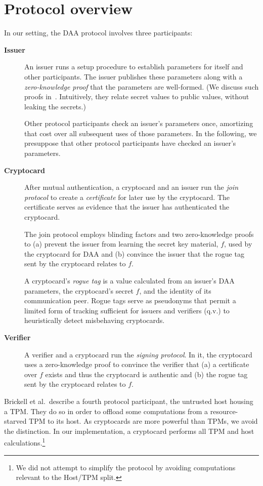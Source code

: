 \section{Protocol overview}

In our setting, the DAA protocol involves three participants:
\begin{description}

\item[\textbf{Issuer}]
An issuer runs a setup procedure to establish
parameters for itself and other participants.
The issuer publishes these parameters along with a
\emph{zero-knowledge proof} that the parameters
are well-formed. (We discuss such proofs in~. Intuitively,
they relate secret values to public values, without leaking the secrets.)

Other protocol participants check an issuer's parameters
once, amortizing that cost over all subsequent uses of those parameters.
In the following, we presuppose that other protocol participants have
checked an issuer's parameters.

\item[\textbf{Cryptocard}]
After mutual authentication, a cryptocard and an issuer run the \emph{join protocol}
to create a \emph{certificate} for later use by the cryptocard.
The certificate serves as evidence that the issuer has authenticated the cryptocard.

The join protocol employs blinding factors and two zero-knowledge proofs
to (a) prevent the issuer from learning the secret key material, $f$, used by the
cryptocard for DAA and (b) convince the issuer that the rogue tag
sent by the cryptocard relates to $f$.

A cryptocard's \emph{rogue tag} is a value calculated from an issuer's DAA parameters,
the cryptocard's secret $f$, and the identity of its communication peer.
Rogue tags serve as pseudonyms that permit a limited
form of tracking sufficient for issuers and verifiers (q.v.) to heuristically
detect misbehaving cryptocards.

\item[\textbf{Verifier}]
A verifier and a cryptocard run the \emph{signing protocol}.
In it, the cryptocard uses a zero-knowledge proof to convince
the verifier that (a) a certificate over $f$ exists and thus the cryptocard
is authentic and (b) the rogue tag sent by the cryptocard relates to $f$.

\end{description}
Brickell et al.\ describe a fourth protocol participant, the untrusted host
housing a TPM.
They do so in order to offload some computations from a resource-starved TPM
to its host.
As cryptocards are more powerful than TPMs, we avoid the distinction.
In our implementation, a cryptocard performs all TPM and
host calculations.\footnote{%
	We did not attempt to simplify the protocol
	by avoiding computations relevant to the Host/TPM split.}

